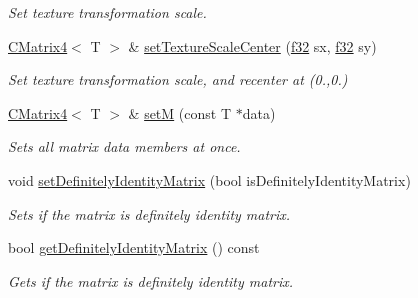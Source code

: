 \begin{DoxyCompactItemize}
\begin{DoxyCompactList}\small\item\em Set texture transformation scale. \end{DoxyCompactList}\item 
\hyperlink{classirr_1_1core_1_1CMatrix4}{C\+Matrix4}$<$ T $>$ \& \hyperlink{classirr_1_1core_1_1CMatrix4_adbd668867d117dc9331e68abef0af221}{set\+Texture\+Scale\+Center} (\hyperlink{namespaceirr_a0277be98d67dc26ff93b1a6a1d086b07}{f32} sx, \hyperlink{namespaceirr_a0277be98d67dc26ff93b1a6a1d086b07}{f32} sy)
\begin{DoxyCompactList}\small\item\em Set texture transformation scale, and recenter at (0.,0.) \end{DoxyCompactList}\item 
\mbox{\label{classirr_1_1core_1_1CMatrix4_ae59fb2248865eba3026d13b9756ba1e1}} 
\hyperlink{classirr_1_1core_1_1CMatrix4}{C\+Matrix4}$<$ T $>$ \& \hyperlink{classirr_1_1core_1_1CMatrix4_ae59fb2248865eba3026d13b9756ba1e1}{setM} (const T $\ast$data)
\begin{DoxyCompactList}\small\item\em Sets all matrix data members at once. \end{DoxyCompactList}\item 
\mbox{\label{classirr_1_1core_1_1CMatrix4_a87f7195337a2bf7a49978c2ec1100c0a}} 
void \hyperlink{classirr_1_1core_1_1CMatrix4_a87f7195337a2bf7a49978c2ec1100c0a}{set\+Definitely\+Identity\+Matrix} (bool is\+Definitely\+Identity\+Matrix)
\begin{DoxyCompactList}\small\item\em Sets if the matrix is definitely identity matrix. \end{DoxyCompactList}\item 
\mbox{\label{classirr_1_1core_1_1CMatrix4_af71afd95d942162c1ba5f38b01396dd3}} 
bool \hyperlink{classirr_1_1core_1_1CMatrix4_af71afd95d942162c1ba5f38b01396dd3}{get\+Definitely\+Identity\+Matrix} () const
\begin{DoxyCompactList}\small\item\em Gets if the matrix is definitely identity matrix. \end{DoxyCompactList}\item 
\mbox{\label{classirr_1_1core_1_1CMatrix4_abd3c6b6c69db075a70f65d3030113d3f}} 

\end{DoxyCompactItemize}
